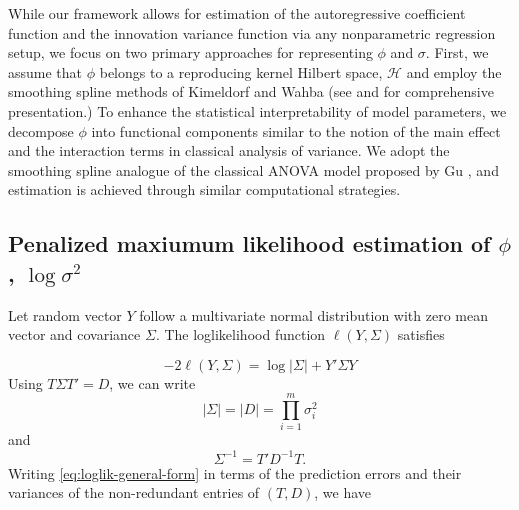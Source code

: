 \documentclass[12pt]{article}
\theoremstyle{definition}
\begin{document}
\bigskip

While our framework allows for estimation of the autoregressive coefficient function and the innovation variance function via any nonparametric regression setup, we focus on two primary approaches for representing $\phi$ and $\sigma$. First, we assume that $\phi$ belongs to a reproducing kernel Hilbert space, $\mathcal{H}$ and employ the smoothing spline methods of Kimeldorf and Wahba (see \citet{kimeldorf1971some} and \citet{wahba1990spline} for comprehensive presentation.)  To enhance the statistical interpretability of model parameters, we decompose $\phi$ into functional components similar to the notion of the main effect and the interaction terms in classical analysis of variance. We adopt the smoothing spline analogue of the classical ANOVA model proposed by Gu \citet{gu2013smoothing}, and estimation is achieved through similar computational strategies.

\subsection{Penalized maxiumum likelihood estimation of $\phi$, $\log\sigma^2$}

Let random vector $Y$ follow a multivariate normal distribution with zero mean vector and covariance $\Sigma$. The loglikelihood function $\ell \left( Y, \Sigma \right)$ satisfies

\begin{equation} \label{eq:loglik-general-form}
-2\ell\left( Y, \Sigma \right) = \log \vert \Sigma \vert + Y' \Sigma Y
\end{equation}
\noindent
Using $T \Sigma T' = D$, we can write 
\[
\vert \Sigma\vert = \vert D \vert = \prod_{i = 1}^m \sigma_i^2
\]
and 
\[
\Sigma^{-1} = T' D^{-1} T.
\]
Writing \ref{eq:loglik-general-form} in terms of the prediction errors and their variances of the non-redundant entries of $\left(T , D\right)$, we have
\end{document}
